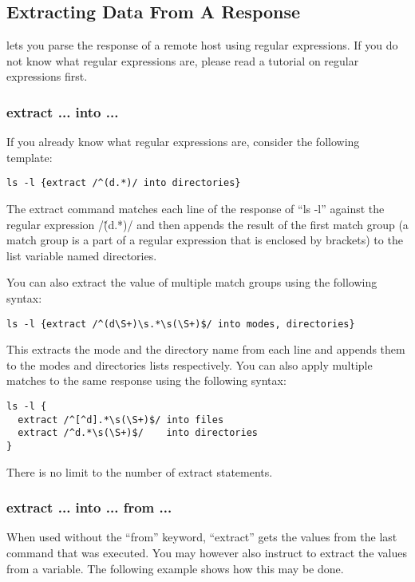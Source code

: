 \subsection{Extracting Data From A Response}

\product lets you parse the response of a remote host using regular 
expressions. If you do not know what regular expressions are, please read 
a tutorial on regular expressions first.

\subsubsection{extract ... into ...}

If you already know what regular expressions are, consider the following 
template: 

\begin{lstlisting}
ls -l {extract /^(d.*)/ into directories}
\end{lstlisting}

The extract command matches each line of the response of ``ls -l'' against 
the regular expression /\^(d.*)/ and then appends the result of the first 
match group (a match group is a part of a regular expression that is 
enclosed by brackets) to the list variable named directories. 

You can also extract the value of multiple match groups using the following 
syntax: 

\begin{lstlisting}
ls -l {extract /^(d\S+)\s.*\s(\S+)$/ into modes, directories}
\end{lstlisting}

This extracts the mode and the directory name from each line and appends 
them to the modes and directories lists respectively. You can also apply 
multiple matches to the same response using the following syntax: 

\begin{lstlisting}
ls -l {
  extract /^[^d].*\s(\S+)$/ into files
  extract /^d.*\s(\S+)$/    into directories
}
\end{lstlisting}

There is no limit to the number of extract statements. 


\subsubsection{extract ... into ... from ...}

When used without the ``from'' keyword, ``extract'' gets the values from the 
last command that was executed. You may however also instruct \product to 
extract the values from a variable. The following example shows how this 
may be done. 

